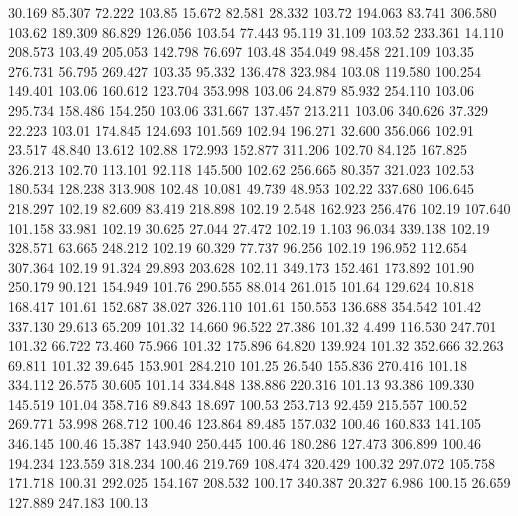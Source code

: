   30.169   85.307   72.222       103.85
  15.672   82.581   28.332       103.72
 194.063   83.741  306.580       103.62
 189.309   86.829  126.056       103.54
  77.443   95.119   31.109       103.52
 233.361   14.110  208.573       103.49
 205.053  142.798   76.697       103.48
 354.049   98.458  221.109       103.35
 276.731   56.795  269.427       103.35
  95.332  136.478  323.984       103.08
 119.580  100.254  149.401       103.06
 160.612  123.704  353.998       103.06
  24.879   85.932  254.110       103.06
 295.734  158.486  154.250       103.06
 331.667  137.457  213.211       103.06
 340.626   37.329   22.223       103.01
 174.845  124.693  101.569       102.94
 196.271   32.600  356.066       102.91
  23.517   48.840   13.612       102.88
 172.993  152.877  311.206       102.70
  84.125  167.825  326.213       102.70
 113.101   92.118  145.500       102.62
 256.665   80.357  321.023       102.53
 180.534  128.238  313.908       102.48
  10.081   49.739   48.953       102.22
 337.680  106.645  218.297       102.19
  82.609   83.419  218.898       102.19
   2.548  162.923  256.476       102.19
 107.640  101.158   33.981       102.19
  30.625   27.044   27.472       102.19
   1.103   96.034  339.138       102.19
 328.571   63.665  248.212       102.19
  60.329   77.737   96.256       102.19
 196.952  112.654  307.364       102.19
  91.324   29.893  203.628       102.11
 349.173  152.461  173.892       101.90
 250.179   90.121  154.949       101.76
 290.555   88.014  261.015       101.64
 129.624   10.818  168.417       101.61
 152.687   38.027  326.110       101.61
 150.553  136.688  354.542       101.42
 337.130   29.613   65.209       101.32
  14.660   96.522   27.386       101.32
   4.499  116.530  247.701       101.32
  66.722   73.460   75.966       101.32
 175.896   64.820  139.924       101.32
 352.666   32.263   69.811       101.32
  39.645  153.901  284.210       101.25
  26.540  155.836  270.416       101.18
 334.112   26.575   30.605       101.14
 334.848  138.886  220.316       101.13
  93.386  109.330  145.519       101.04
 358.716   89.843   18.697       100.53
 253.713   92.459  215.557       100.52
 269.771   53.998  268.712       100.46
 123.864   89.485  157.032       100.46
 160.833  141.105  346.145       100.46
  15.387  143.940  250.445       100.46
 180.286  127.473  306.899       100.46
 194.234  123.559  318.234       100.46
 219.769  108.474  320.429       100.32
 297.072  105.758  171.718       100.31
 292.025  154.167  208.532       100.17
 340.387   20.327    6.986       100.15
  26.659  127.889  247.183       100.13
